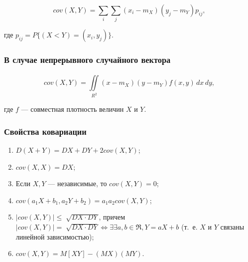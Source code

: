 \begin{equation}
	cov(X, Y) =  \sum_{i}^{} \sum_{j}^{} (x_{i} - m_{X})(y_{j} - m_{Y})p_{ij},
\end{equation}

где $p_{ij} = P\{(X< Y) = (x_{i}, y_{j})\}$.

\subsubsection*{В случае непрерывного случайного вектора}

\begin{equation}
	cov(X, Y) = \iint\limits_{R^{2}}^{} (x - m_{X})(y - m_{Y})f(x, y)\,dx\,dy,
\end{equation}

где $f$ --- совместная плотность величин $X$ и $Y$.

\subsubsection*{Свойства ковариации}

\begin{enumerate}
	\item $D(X + Y) = DX + DY + 2cov(X, Y)$;
	\item $cov(X, X) = DX$;
	\item Если $X, Y$ --- независимые, то $cov(X, Y) = 0$;
	\item $cov(a_{1}X + b_{1}, a_{2}Y + b_{2}) = a_{1}a_{2}cov(X, Y)$;
	\item $|cov(X, Y)| \leqslant \sqrt[]{DX \cdot DY}$, причем $|cov(X, Y)| = \sqrt[]{DX \cdot DY} \iff \exists \exists a, b \in \Re, Y = aX + b$ (т.~е. $X$ и $Y$ связаны линейной зависимостью);
	\item $cov(X, Y) = M[XY] - (MX)(MY)$.
\end{enumerate}